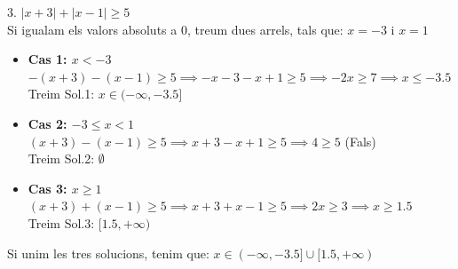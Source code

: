 3. $|x + 3| + |x - 1| \geq 5$ \\

Si igualam els valors absoluts a 0, treum dues arrels, tals que: $x = -3$ i $x = 1$
\begin{itemize}
\item \textbf{Cas 1: $x < -3$}\\
$-(x + 3) - (x - 1) \geq 5 \implies -x - 3 - x + 1 \geq 5 \implies -2x \geq 7 \implies x \leq -3.5$ \\
Treim Sol.1: $x \in (-\infty, -3.5]$
\item \textbf{Cas 2: $-3 \leq x < 1$} \\
$(x + 3) - (x - 1) \geq 5 \implies x + 3 - x + 1 \geq 5 \implies 4 \geq 5$ (Fals) \\
Treim Sol.2: $\emptyset$
\item \textbf{Cas 3: $x \geq 1$} \\
$(x + 3) + (x - 1) \geq 5 \implies x + 3 + x - 1 \geq 5 \implies 2x \geq 3 \implies x \geq 1.5$ \\
Treim Sol.3: $[1.5, +\infty)$
\end{itemize}
Si unim les tres solucions, tenim que: $x \in (-\infty, -3.5] \cup [1.5, +\infty)$\\